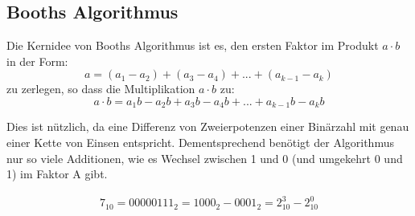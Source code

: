 \documentclass[12pt]{report}
\begin{document}
\subsection{Booths Algorithmus}
\begin{defbox}
  Die Kernidee von Booths Algorithmus ist es, den ersten Faktor im Produkt $a \cdot b$ in der Form:
  $$a = (a_1 - a_2) + (a_3 - a_4) + ... + (a_{k-1} - a_k)$$
  zu zerlegen, so dass die Multiplikation $a \cdot b$ zu:
  $$a \cdot b = a_1b - a_2b + a_3b - a_4b + ... + a_{k-1}b - a_kb$$
  
  Dies ist nützlich, da eine Differenz von Zweierpotenzen einer Binärzahl mit genau einer Kette von Einsen entspricht.
  Dementsprechend benötigt der Algorithmus nur so viele Additionen, wie es Wechsel zwischen 1 und 0 (und umgekehrt 0 und 1) im Faktor A gibt.
  
  \begin{align*}
    7_{10} = 00000111_2 = 1000_2 - 0001_2 = 2^3_{10} - 2^0_{10}
  \end{align*}
\end{defbox}
\end{document}
